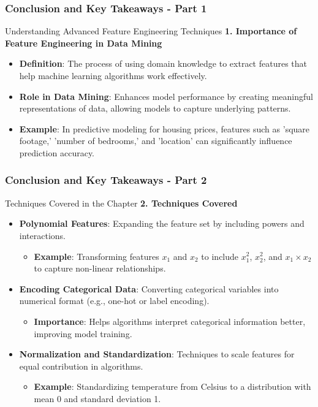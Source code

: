 \documentclass[aspectratio=169]{beamer}
\begin{document}
\begin{frame}[fragile]
    \frametitle{Conclusion and Key Takeaways - Part 1}
    
    \begin{block}{Understanding Advanced Feature Engineering Techniques}
        \textbf{1. Importance of Feature Engineering in Data Mining}
    \end{block}
    
    \begin{itemize}
        \item \textbf{Definition}: The process of using domain knowledge to extract features that help machine learning algorithms work effectively.
        \item \textbf{Role in Data Mining}: Enhances model performance by creating meaningful representations of data, allowing models to capture underlying patterns.
        \item \textbf{Example}: In predictive modeling for housing prices, features such as 'square footage,' 'number of bedrooms,' and 'location' can significantly influence prediction accuracy.
    \end{itemize}
\end{frame}

\begin{frame}[fragile]
    \frametitle{Conclusion and Key Takeaways - Part 2}
    
    \begin{block}{Techniques Covered in the Chapter}
        \textbf{2. Techniques Covered}
    \end{block}
    
    \begin{itemize}
        \item \textbf{Polynomial Features}: Expanding the feature set by including powers and interactions.
            \begin{itemize}
                \item \textbf{Example}: Transforming features \( x_1 \) and \( x_2 \) to include \( x_1^2 \), \( x_2^2 \), and \( x_1 \times x_2 \) to capture non-linear relationships.
            \end{itemize}
        \item \textbf{Encoding Categorical Data}: Converting categorical variables into numerical format (e.g., one-hot or label encoding).
            \begin{itemize}
                \item \textbf{Importance}: Helps algorithms interpret categorical information better, improving model training.
            \end{itemize}
        \item \textbf{Normalization and Standardization}: Techniques to scale features for equal contribution in algorithms.
            \begin{itemize}
                \item \textbf{Example}: Standardizing temperature from Celsius to a distribution with mean 0 and standard deviation 1.
            \end{itemize}
    \end{itemize}
\end{frame}
\end{document}
